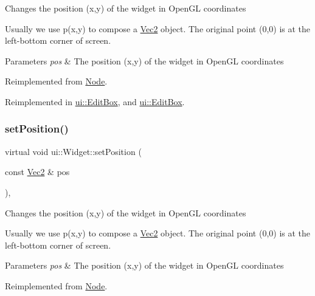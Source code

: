 Changes the position (x,y) of the widget in Open\+GL coordinates

Usually we use p(x,y) to compose a \hyperlink{classVec2}{Vec2} object. The original point (0,0) is at the left-\/bottom corner of screen.


\begin{DoxyParams}{Parameters}
{\em pos} & The position (x,y) of the widget in Open\+GL coordinates \\
\hline
\end{DoxyParams}


Reimplemented from \hyperlink{classNode_a8ffbf25763ef5f15eeae7227779505bc}{Node}.



Reimplemented in \hyperlink{classui_1_1EditBox_a92e525c7152c0a974632d4810b392f11}{ui\+::\+Edit\+Box}, and \hyperlink{classui_1_1EditBox_a9920fc994750f83db1c80be0417143f6}{ui\+::\+Edit\+Box}.

\mbox{\label{classui_1_1Widget_a290404b9d89d66e9f5bc7225fe68f2b5}} 
\subsubsection{\texorpdfstring{set\+Position()}{setPosition()}\hspace{0.1cm}{\footnotesize\ttfamily [2/2]}}
{\footnotesize\ttfamily virtual void ui\+::\+Widget\+::set\+Position (\begin{DoxyParamCaption}\item[{const \hyperlink{classVec2}{Vec2} \&}]{pos }\end{DoxyParamCaption})\hspace{0.3cm}{\ttfamily [override]}, {\ttfamily [virtual]}}

Changes the position (x,y) of the widget in Open\+GL coordinates

Usually we use p(x,y) to compose a \hyperlink{classVec2}{Vec2} object. The original point (0,0) is at the left-\/bottom corner of screen.


\begin{DoxyParams}{Parameters}
{\em pos} & The position (x,y) of the widget in Open\+GL coordinates \\
\hline
\end{DoxyParams}


Reimplemented from \hyperlink{classNode_a8ffbf25763ef5f15eeae7227779505bc}{Node}.




